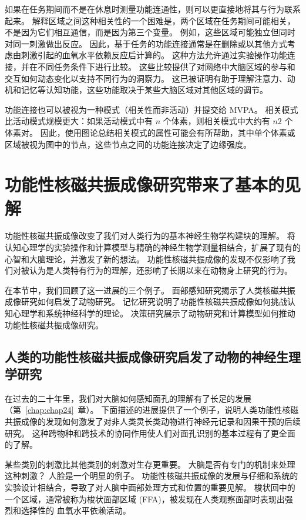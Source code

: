 如果在任务期间而不是在休息时测量功能连通性，则可以更直接地将其与行为联系起来。 
解释区域之间这种相关性的一个困难是，两个区域在任务期间可能相关，不是因为它们相互通信，而是因为第三个变量。
例如，这些区域可能独立但同时对同一刺激做出反应。
因此，基于任务的功能连接通常是在删除或以其他方式考虑由刺激引起的血氧水平依赖反应后计算的。 
这种方法允许通过实验操作功能连接，并在不同任务条件下进行比较。
这些比较提供了对网络中大脑区域的参与和交互如何动态变化以支持不同行为的洞察力。
这已被证明有助于理解注意力、动机和记忆等认知功能，这些功能取决于某些大脑区域对其他区域的调节。


功能连接也可以被视为一种模式（相关性而非活动）并提交给 MVPA。 
相关模式比活动模式规模更大：如果活动模式中有 $n$ 个体素，则相关模式中大约有 $n2$ 个体素对。 
因此，使用图论总结相关模式的属性可能会有所帮助，其中单个体素或区域被视为图中的节点，这些节点之间的功能连接决定了边缘强度。



\section{功能性核磁共振成像研究带来了基本的见解}

功能性核磁共振成像改变了我们对人类行为的基本神经生物学构建块的理解。
将认知心理学的实验操作和计算模型与精确的神经生物学测量相结合，扩展了现有的心智和大脑理论，并激发了新的想法。
功能性核磁共振成像的发现不仅影响了我们对被认为是人类特有行为的理解，还影响了长期以来在动物身上研究的行为。


在本节中，我们回顾了这一进展的三个例子。 
面部感知研究揭示了人类核磁共振成像研究如何启发了动物研究。 
记忆研究说明了功能性核磁共振成像如何挑战认知心理学和系统神经科学的理论。 
决策研究展示了动物研究和计算模型如何推动功能性核磁共振成像研究。


\subsection{人类的功能性核磁共振成像研究启发了动物的神经生理学研究}

在过去的二十年里，我们对大脑如何感知面孔的理解有了长足的发展（第~\ref{chap:chap24}~章）。 
下面描述的进展提供了一个例子，说明人类功能性核磁共振成像的发现如何激发了对非人类灵长类动物进行神经元记录和因果干预的后续研究。
这种跨物种和跨技术的协同作用使人们对面孔识别的基本过程有了更全面的了解。


某些类别的刺激比其他类别的刺激对生存更重要。 
大脑是否有专门的机制来处理这种刺激？ 
人脸是一个明显的例子。 
功能性核磁共振成像的发展与仔细和系统的实验设计相结合，导致了对人脑中面部处理方式和位置的重要见解。 
梭状回中的一个区域，通常被称为梭状面部区域 (FFA)，被发现在人类观察面部时表现出强烈和选择性的 血氧水平依赖活动。


